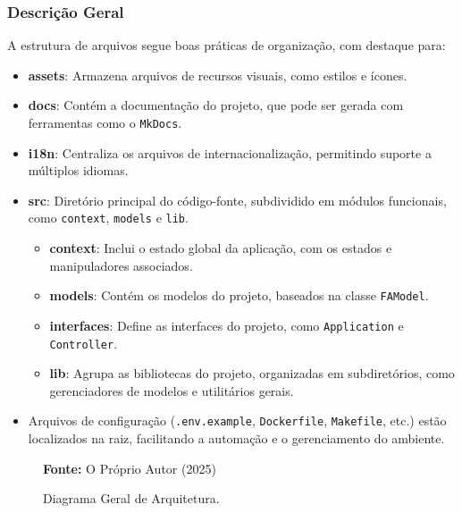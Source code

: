 \newpage

\subsubsection{Descrição Geral}

A estrutura de arquivos segue boas práticas de organização, com destaque para:

\begin{itemize}\label{list:3:estrutura-arquivos}
    \item \textbf{assets}: Armazena arquivos de recursos visuais, como estilos e ícones.

    \item \textbf{docs}: Contém a documentação do projeto, que pode ser gerada com ferramentas como o \texttt{MkDocs}.

    \item \textbf{i18n}: Centraliza os arquivos de internacionalização, permitindo suporte a múltiplos idiomas.

    \item \textbf{src}: Diretório principal do código-fonte, subdividido em módulos funcionais, como \texttt{context}, \texttt{models} e \texttt{lib}.

    \begin{itemize}
        \item \textbf{context}: Inclui o estado global da aplicação, com os estados e manipuladores associados.

        \item \textbf{models}: Contém os modelos do projeto, baseados na classe \texttt{FAModel}.

        \item \textbf{interfaces}: Define as interfaces do projeto, como \texttt{Application} e \texttt{Controller}.

        \item \textbf{lib}: Agrupa as bibliotecas do projeto, organizadas em subdiretórios, como gerenciadores de modelos e utilitários gerais.
    \end{itemize}

    \item Arquivos de configuração (\texttt{.env.example}, \texttt{Dockerfile}, \texttt{Makefile}, etc.) estão localizados na raiz, facilitando a automação e o gerenciamento do ambiente.
\end{itemize}

\begin{figure}[h!]
    \centerline{}
    \caption{Diagrama Geral de Arquitetura.}
    \centerline{\textbf{Fonte:} O Próprio Autor (2025)}
    \label{fig:3:cd-arch}
\end{figure}


